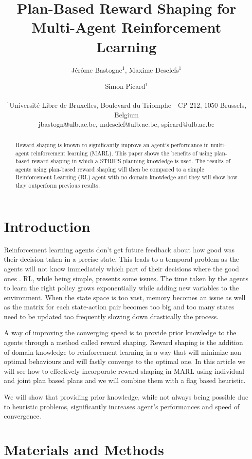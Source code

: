 \documentclass[letterpaper]{article}
\title{Plan-Based Reward Shaping for Multi-Agent Reinforcement Learning}
\author{Jérôme Bastogne$^{1}$, Maxime Desclefs$^{1}$ \and Simon Picard$^{1}$ \\
\mbox{}\\
$^1$Université Libre de Bruxelles, Boulevard du Triomphe - CP 212, 1050 Brussels, Belgium \\
jbastogn@ulb.ac.be, mdesclef@ulb.ac.be, spicard@ulb.ac.be}
\begin{document}
\maketitle

\begin{abstract}
Reward shaping is known to significantly improve an agent’s performance in multi-agent reinforcement
learning (MARL). This paper shows the benefits of using plan-based reward shaping in which a STRIPS planning knowledge is used. The results of agents using plan-based reward shaping will then be compared to a simple Reinforcement Learning (RL) agent with no domain knowledge and they will show how they outperform previous results.
\end{abstract}

\section{Introduction}

Reinforcement learning agents don't get future feedback about how good was their decision taken in a precise state. This leads to a temporal problem as the agents will not know immediately which part of their decisions where the good ones \citep{rs}. RL, while being simple, presents some issues. The time taken by the agents to learn the right policy grows exponentially while adding new variables to the environment. When the state space is too vast, memory becomes an issue as well as the matrix for each state-action pair becomes too big and too many states need to be updated too frequently slowing down drastically the process. 

A way of improving the converging speed is to provide prior knowledge to the agents through a method called reward shaping. Reward shaping is the addition of domain knowledge to reinforcement learning in a way that will minimize non-optimal behaviours and will fastly converge to the optimal one. In this article we will see how to effectively incorporate reward shaping in MARL using individual and joint plan based plans and we will combine them with a flag based heuristic\citep{paper4}.

We will show that providing prior knowledge, while not always being possible due to heuristic problems, significantly increases agent's performances and speed of convergence.


\section{Materials and Methods}
\end{document}
